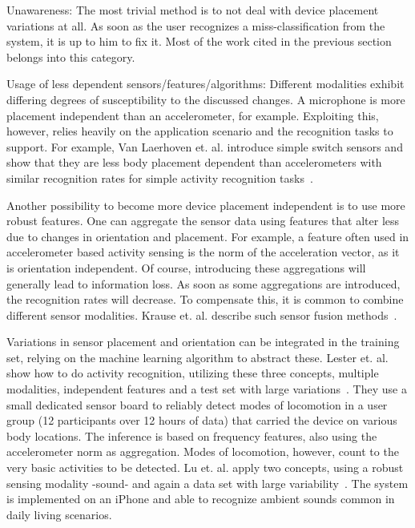 \begin{description}
 \item{Unawareness:} The most trivial method is to not deal with device placement variations 
 at all. As soon as the user recognizes a miss-classification from
 the system, it is up to him to fix it. Most of the work cited in
 the previous section belongs into this category. 
 \item{Usage of less dependent sensors/features/algorithms:} 
 Different modalities exhibit differing degrees of susceptibility to the discussed changes. 
 A microphone is more placement independent than
 an accelerometer, for example. Exploiting this, however, relies heavily on the application
 scenario and the recognition tasks to support. 
 For example, Van Laerhoven et. al. introduce simple switch sensors and show that they are less body placement dependent than 
 accelerometers with similar recognition rates for simple activity recognition
 tasks~\cite{vanLaerhoven:2004p1442}. 

Another possibility to become more device placement independent is to use more robust features. 
One can aggregate the sensor data using features that alter less due to changes in orientation and placement. 
 For example, a feature often used in accelerometer based
 activity sensing is the norm of the acceleration vector, as it is orientation independent. Of course, introducing 
 these aggregations will generally lead to information loss. As soon as some aggregations are introduced, the recognition rates will decrease. 
To compensate this, it is common to combine different sensor modalities. Krause et. al. 
 describe such sensor fusion methods~\cite{Krause:2003p1536}.

 Variations in sensor placement and orientation 
 can be integrated in the training set, relying on the machine
 learning algorithm to abstract these. 
 Lester et. al. show how to do activity recognition, utilizing these three concepts, multiple modalities, 
 independent features and a test set with large variations~\cite{Lester:2006p856}. They use
 a small dedicated sensor board to reliably detect modes of locomotion
 in a user group (12 participants over 12 hours of data) that carried the device
 on various body locations. The inference is based on frequency features, also
 using the accelerometer norm as aggregation. Modes of locomotion, however,
 count to the very basic activities to be detected.
 Lu et. al. apply two concepts, using a robust sensing modality -sound- and again
 a data set with large variability~\cite{Lu:2009p7766}. The system is implemented
 on an iPhone and able to recognize ambient sounds common
 in daily living scenarios.



\end{description}
